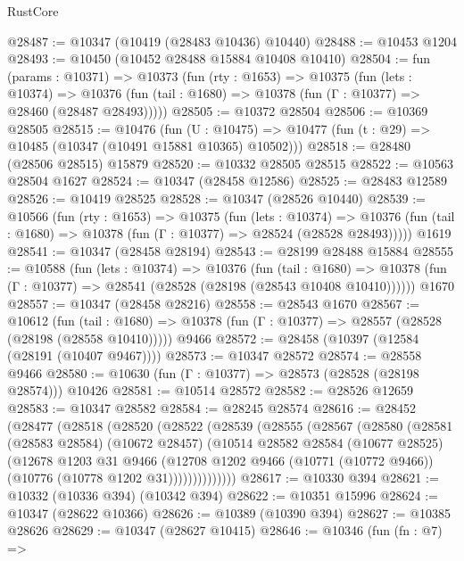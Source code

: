 \begin{lexlean}{RustCore}
\begin{coremodule}
@28487 := @10347 (@10419 (@28483 @10436) @10440)
@28488 := @10453 @1204
@28493 := @10450 (@10452 @28488 @15884 @10408 @10410)
@28504 := fun (params : @10371) =>
  @10373
    (fun (rty : @1653) =>
    @10375
      (fun (lets : @10374) =>
      @10376 (fun (tail : @1680) => @10378 (fun (Γ : @10377) => @28460 (@28487 @28493)))))
@28505 := @10372 @28504
@28506 := @10369 @28505
@28515 := @10476
    (fun (U : @10475) => @10477 (fun (t : @29) => @10485 (@10347 (@10491 @15881 @10365) @10502)))
@28518 := @28480 (@28506 @28515) @15879
@28520 := @10332 @28505 @28515
@28522 := @10563 @28504 @1627
@28524 := @10347 (@28458 @12586)
@28525 := @28483 @12589
@28526 := @10419 @28525
@28528 := @10347 (@28526 @10440)
@28539 := @10566
    (fun (rty : @1653) =>
    @10375
      (fun (lets : @10374) =>
      @10376 (fun (tail : @1680) => @10378 (fun (Γ : @10377) => @28524 (@28528 @28493)))))
    @1619
@28541 := @10347 (@28458 @28194)
@28543 := @28199 @28488 @15884
@28555 := @10588
    (fun (lets : @10374) =>
    @10376
      (fun (tail : @1680) =>
      @10378 (fun (Γ : @10377) => @28541 (@28528 (@28198 (@28543 @10408 @10410))))))
    @1670
@28557 := @10347 (@28458 @28216)
@28558 := @28543 @1670
@28567 := @10612
    (fun (tail : @1680) => @10378 (fun (Γ : @10377) => @28557 (@28528 (@28198 (@28558 @10410)))))
    @9466
@28572 := @28458 (@10397 (@12584 (@28191 (@10407 @9467))))
@28573 := @10347 @28572
@28574 := @28558 @9466
@28580 := @10630 (fun (Γ : @10377) => @28573 (@28528 (@28198 @28574))) @10426
@28581 := @10514 @28572
@28582 := @28526 @12659
@28583 := @10347 @28582
@28584 := @28245 @28574
@28616 := @28452
    (@28477
      (@28518
        (@28520
          (@28522
            (@28539
              (@28555
                (@28567
                  (@28580
                    (@28581
                      (@28583 @28584)
                      (@10672 @28457)
                      (@10514
                        @28582
                        @28584
                        (@10677 @28525)
                        (@12678
                          @1203
                          @31
                          @9466
                          (@12708
                            @1202
                            @9466
                            (@10771 (@10772 @9466))
                            (@10776 (@10778 @1202 @31))))))))))))))
@28617 := @10330 @394
@28621 := @10332 (@10336 @394) (@10342 @394)
@28622 := @10351 @15996
@28624 := @10347 (@28622 @10366)
@28626 := @10389 (@10390 @394)
@28627 := @10385 @28626
@28629 := @10347 (@28627 @10415)
@28646 := @10346
    (fun (fn : @7) =>

\end{coremodule}
\end{lexlean}
